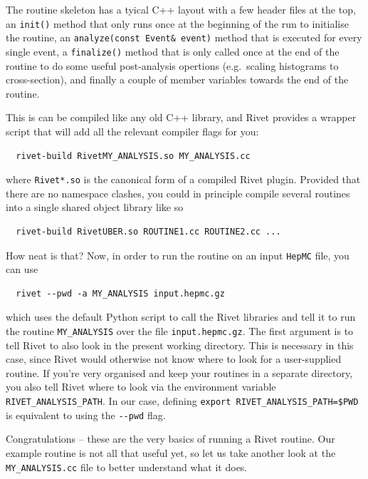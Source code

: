 \documentclass[10pt,fleqn]{scrartcl}
\theoremstyle{exstyle}
\begin{document}
The routine skeleton has a tyical C++ layout with a few header files at the top,
an \verb|init()| method that only runs once at the beginning of the run %
to initialise the routine, an \verb|analyze(const Event& event)| method that is executed for every
single event, a \verb|finalize()| method that is only called once at the end of the routine
to do some useful post-analysis opertions (e.g.\ scaling histograms to cross-section),
and finally a couple of member variables towards the end of the routine.

This is can be compiled like any old C++ library, and Rivet provides a wrapper script
that will add all the relevant compiler flags for you: 
\begin{verbatim}
  rivet-build RivetMY_ANALYSIS.so MY_ANALYSIS.cc
\end{verbatim}
where \verb|Rivet*.so| is the canonical form of a compiled Rivet plugin. 
Provided that there are no namespace clashes, you could in principle 
compile several routines into a single shared object library like so
\begin{verbatim}
  rivet-build RivetUBER.so ROUTINE1.cc ROUTINE2.cc ...
\end{verbatim}
How neat is that? Now, in order to run the routine on an input \texttt{HepMC} file, 
you can use
\begin{verbatim}
  rivet --pwd -a MY_ANALYSIS input.hepmc.gz
\end{verbatim}
which uses the default Python script to call the Rivet libraries and tell it to run 
the routine \verb|MY_ANALYSIS| over the file \verb|input.hepmc.gz|. The first argument
is to tell Rivet to also look in the present working directory.
This is necessary in this case, since Rivet would otherwise not know where to look
for a user-supplied routine. If you're very organised and keep your routines 
in a separate directory, you also tell Rivet where to look via the environment
variable \verb|RIVET_ANALYSIS_PATH|. In our case, defining 
\verb|export RIVET_ANALYSIS_PATH=$PWD| is equivalent to using the \verb|--pwd| flag.

Congratulations -- these are the very basics of running a Rivet routine. 
Our example routine is not all that useful yet, so let us take another
look at the \verb|MY_ANALYSIS.cc| file to better understand what it does.
\end{document}
